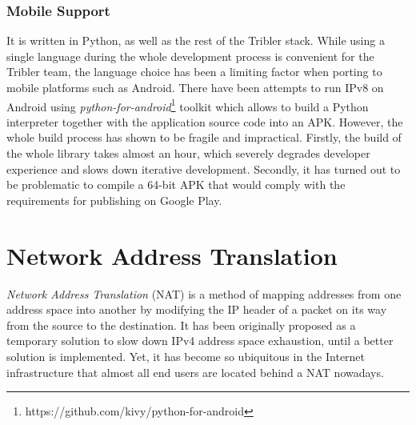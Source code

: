 
\subsubsection{Mobile Support}

It is written in Python, as well as the rest of the Tribler stack. While using a single language during the whole development process is convenient for the Tribler team, the language choice has been a limiting factor when porting to mobile platforms such as Android. There have been attempts to run IPv8 on Android using \textit{python-for-android}\footnote{https://github.com/kivy/python-for-android} toolkit which allows to build a Python interpreter together with the application source code into an APK. However, the whole build process has shown to be fragile and impractical. Firstly, the build of the whole library takes almost an hour, which severely degrades developer experience and slows down iterative development. Secondly, it has turned out to be problematic to compile a 64-bit APK that would comply with the requirements for publishing on Google Play.


\section{Network Address Translation}

\textit{Network Address Translation} (NAT) is a method of mapping addresses from one address space into another by modifying the IP header of a packet on its way from the source to the destination. It has been originally proposed as a temporary solution to slow down IPv4 address space exhaustion, until a better solution is implemented. \cite{nat} Yet, it has become so ubiquitous in the Internet infrastructure that almost all end users are located behind a NAT nowadays.

